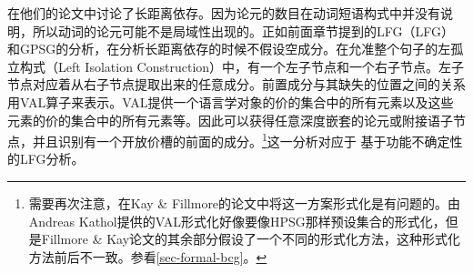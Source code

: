 \mbox{} \citet[\S~3.10]{KF99a}在他们的论文中讨论了长距离依存。因为论元的数目在动词短语构式中并没有说明，所以动词的论元可能不是局域性出现的。正如前面章节提到的LFG\indexlfgc（LFG）和GPSG的分析\indexgpsgc，在分析长距离依存的时候不假设空成分。在允准整个句子的左孤立构式（Left Isolation Construction）中，有一个左子节点和一个右子节点。左子节点对应着从右子节点提取出来的任意成分。前置成分与其缺失的位置之间的关系用VAL算子来表示。VAL提供一个语言学对象的价的集合中的所有元素以及这些元素的价的集合中的所有元素等。因此可以获得任意深度嵌套的论元或附接语子节点，并且识别有一个开放价槽的前面的成分。\footnote{%
   需要再次注意，在Kay \& Fillmore的论文中将这一方案形式化是有问题的。由Andreas Kathol提供的VAL形式化好像要像HPSG那样预设集合的形式化，但是Fillmore \& Kay论文的其余部分假设了一个不同的形式化方法，这种形式化方法前后不一致。参看\ref{sec-formal-bcg}。
 }这一分析对应于 \citet{KZ89a}基于功能不确定性的LFG分析。%

